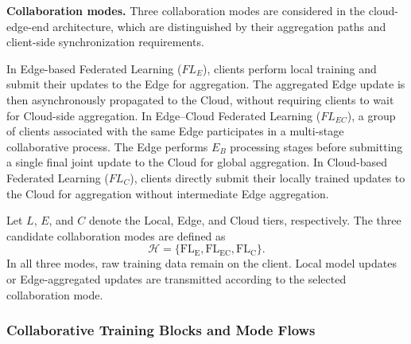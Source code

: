 \documentclass[5p,times]{elsarticle}
\theoremstyle{plain}
\theoremstyle{definition}
\theoremstyle{remark}
\begin{document}
\textbf{Collaboration modes.}
Three collaboration modes are considered in the 
cloud-edge-end architecture, which are distinguished 
by their aggregation paths and client-side synchronization 
requirements.

In Edge-based Federated Learning ($FL_E$), 
clients perform local training and submit their updates 
to the Edge for aggregation. The aggregated Edge update 
is then asynchronously propagated to the Cloud, without 
requiring clients to wait for Cloud-side aggregation. In 
Edge--Cloud Federated Learning ($FL_{EC}$), a group of 
clients associated with the same Edge participates in a 
multi-stage collaborative process. The Edge performs $E_B$ 
processing stages before submitting a single final joint 
update to the Cloud for global aggregation. In Cloud-based 
Federated Learning ($FL_C$), clients directly submit their 
locally trained updates to the Cloud for aggregation without 
intermediate Edge aggregation.

Let \(L\), \(E\), and \(C\) denote the Local, Edge,
and Cloud tiers, respectively. The three candidate
collaboration modes are defined as
\begin{equation}
\mathcal H =
\{\mathrm{FL_E},\mathrm{FL_{EC}},\mathrm{FL_C}\}.
\label{eq:three_modes}
\end{equation}
In all three modes, raw training data remain on
the client. Local model updates or Edge-aggregated
updates are transmitted according to the selected
collaboration mode.


\subsubsection{Collaborative Training Blocks and Mode Flows}
\end{document}
